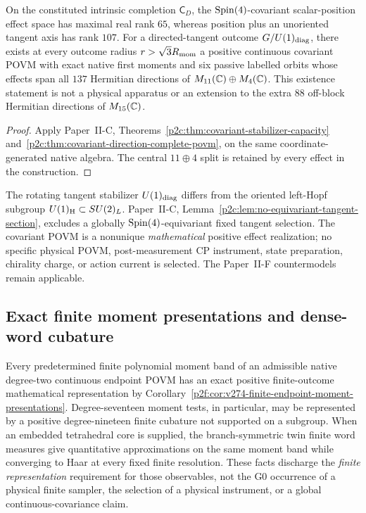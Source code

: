 \documentclass[12pt,a4paper]{article}
\begin{document}
\begin{corollary}
\label{p2e:cor:v270-direction-native-capacity-export}
On the constituted intrinsic completion $\mathsf C_D$, the
$\mathrm{Spin}(4)$-covariant scalar-position effect space has maximal
real rank $65$, whereas position plus an unoriented tangent axis has
rank $107$. For a directed-tangent outcome $G/U(1)_{\rm diag}$,
there exists at every outcome radius $r>\sqrt3R_{\mathrm{mom}}$ a positive
continuous covariant POVM with exact native first moments and six
passive labelled orbits whose effects span all $137$ Hermitian
directions of $M_{11}(\mathbb{C})\oplus M_4(\mathbb{C})$.
This existence statement is not a physical apparatus or an extension
to the extra $88$ off-block Hermitian directions of $M_{15}(\mathbb{C})$.
\end{corollary}
\begin{proof}
Apply Paper~II-C, Theorems~\ref{p2c:thm:covariant-stabilizer-capacity}
and~\ref{p2c:thm:covariant-direction-complete-povm}, on the
same coordinate-generated native algebra. The central $11\oplus4$
split is retained by every effect in the construction.
\end{proof}
\begin{remark}
\label{p2e:rem:v270-no-readout-selection}
The rotating tangent stabilizer $U(1)_{\rm diag}$ differs from the
oriented left-Hopf subgroup $U(1)_{\rm H}\subset SU(2)_L$.
Paper~II-C, Lemma~\ref{p2c:lem:no-equivariant-tangent-section},
excludes a globally $\mathrm{Spin}(4)$-equivariant fixed tangent selection.
The covariant POVM is a nonunique \emph{mathematical} positive effect
realization; no specific physical POVM, post-measurement CP instrument,
state preparation, chirality charge, or action current is selected.
The Paper~II-F countermodels remain applicable.
\end{remark}


\subsection{Exact finite moment presentations and dense-word cubature}
\begin{corollary}
\label{p2e:cor:v274-moment-finite-presentation-export}
Every predetermined finite polynomial moment band of an admissible
native degree-two continuous endpoint POVM has an exact positive
finite-outcome mathematical representation by
Corollary~\ref{p2f:cor:v274-finite-endpoint-moment-presentations}.
Degree-seventeen moment tests, in particular, may be represented by
a positive degree-nineteen finite cubature not supported on a
subgroup. When an embedded tetrahedral core is supplied, the
branch-symmetric twin finite word measures give quantitative
approximations on the same moment band while converging to Haar at
every fixed finite resolution. These facts discharge the
\emph{finite representation} requirement for those observables,
not the G0 occurrence of a physical finite sampler, the selection
of a physical instrument, or a global continuous-covariance claim.
\end{corollary}
\end{document}
